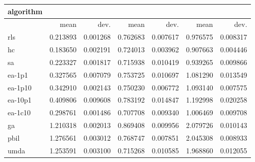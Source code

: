 \begin{tabular}{@{}l*{6}{>{{}}N{1}{2}}@{}}
\toprule
{algorithm} &  &  &  \\
\midrule
& {mean} & {dev.} & {mean} & {dev.} & {mean} & {dev.} \\
\midrule
rls & 0.213893 & 0.001268 & 0.762683 & 0.007617 & 0.976575 & 0.008317 \\
 hc & 0.183650 & 0.002191 & 0.724013 & 0.003962 & 0.907663 & 0.004446 \\
 sa & 0.223327 & 0.001817 & 0.715938 & 0.010419 & 0.939265 & 0.009866 \\
 ea-1p1 & 0.327565 & 0.007079 & 0.753725 & 0.010697 & 1.081290 & 0.013549 \\
 ea-1p10 & 0.342910 & 0.002143 & 0.750230 & 0.006772 & 1.093140 & 0.007575 \\
 ea-10p1 & 0.409806 & 0.009608 & 0.783192 & 0.014847 & 1.192998 & 0.020258 \\
 ea-1c10 & 0.298761 & 0.001486 & 0.707708 & 0.009340 & 1.006469 & 0.009708 \\
 ga & 1.210318 & 0.002013 & 0.869408 & 0.009956 & 2.079726 & 0.010143 \\
 pbil & 1.276561 & 0.003012 & 0.768747 & 0.007851 & 2.045308 & 0.008933 \\
 umda & 1.253591 & 0.003100 & 0.715268 & 0.010585 & 1.968860 & 0.012055 \\
 \bottomrule
\end{tabular}
